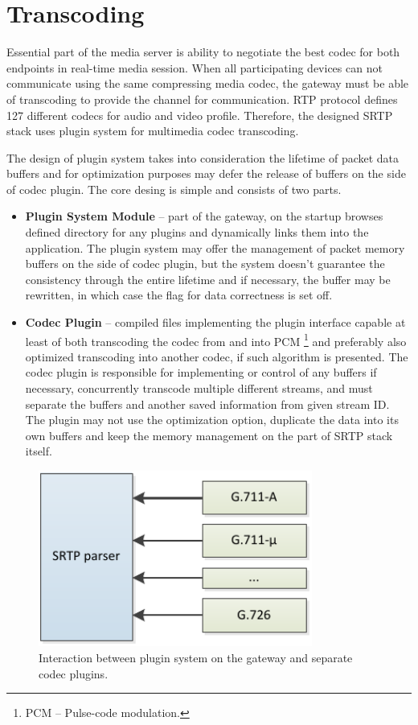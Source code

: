 \section{Transcoding}
Essential part of the media server is ability to negotiate the best codec for
both endpoints in real-time media session. When all participating devices can
not communicate using the same compressing media codec, the gateway must be able
of transcoding to provide the channel for communication. RTP protocol defines
127 different codecs for audio and video profile. Therefore, the designed 
SRTP stack uses plugin system for multimedia codec transcoding.

The design of plugin system takes into consideration the lifetime of packet data 
buffers and  for optimization purposes may defer the release of buffers on the 
side of codec plugin. The core desing is simple and consists of two parts.

\begin{itemize}
\item \textbf{Plugin System Module} -- part of the gateway, on the startup 
browses defined directory for any plugins and dynamically links them into the 
application. The plugin system may offer the management of packet memory buffers
on the side of codec plugin, but the system doesn't guarantee the consistency 
through the entire lifetime and if necessary, the buffer may be rewritten, in 
which case the flag for data correctness is set off. 
\item \textbf{Codec Plugin} -- compiled files implementing the plugin interface
capable at least of both transcoding the codec from and into PCM \footnote{ PCM 
-- Pulse-code modulation.} and preferably also optimized transcoding into
another codec, if such algorithm is presented. The codec plugin is responsible
for implementing or control of any buffers if necessary, concurrently transcode 
multiple different streams, and must separate the buffers and another saved 
information from given stream ID. The plugin may not use the optimization 
option, duplicate the data into its own buffers and keep the memory management
on the part of SRTP stack itself.  
\end{itemize}  

\begin{figure}[H]
\centering
\includegraphics[width=9cm]{fig/plugins.pdf}
\caption[Plugin system design]{Interaction between plugin system on the gateway 
and separate codec plugins.}
\label{pt_payload}
\end{figure} 


